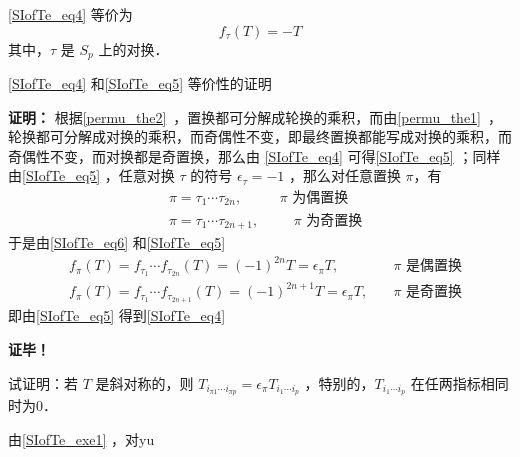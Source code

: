 \autoref{SIofTe_eq4} 等价为
\begin{equation}\label{SIofTe_eq5}
f_\tau(T)=-T
\end{equation}
其中，$\tau$ 是 $S_p$ 上的对换．
\begin{example}{}
\autoref{SIofTe_eq4} 和\autoref{SIofTe_eq5} 等价性的证明

\textbf{证明：}
根据\autoref{permu_the2}~，置换都可分解成轮换的乘积，而由\autoref{permu_the1}~，轮换都可分解成对换的乘积，而奇偶性不变，即最终置换都能写成对换的乘积，而奇偶性不变，而对换都是奇置换，那么由 \autoref{SIofTe_eq4} 可得\autoref{SIofTe_eq5} ；同样由\autoref{SIofTe_eq5} ，任意对换 $\tau$ 的符号 $\epsilon_\tau=-1$ ，那么对任意置换 $\pi$，有
\begin{equation}
\begin{aligned}
&\pi=\tau_1\cdots\tau_{2n}, \quad &\text{ $\pi$ 为偶置换}\\
&\pi=\tau_1\cdots\tau_{2n+1}, &\quad \text{ $\pi$ 为奇置换}
\end{aligned}
\end{equation}
于是由\autoref{SIofTe_eq6} 和\autoref{SIofTe_eq5} 
\begin{equation}
\begin{aligned}
&f_\pi(T)=f_{\tau_1}\cdots f_{\tau_{2n}}(T)=(-1)^{2n}T=\epsilon_\pi T,\quad&\text{$\pi$ 是偶置换}\\
&f_\pi(T)=f_{\tau_1}\cdots f_{\tau_{2n+1}}(T)=(-1)^{2n+1}T=\epsilon_\pi T,\quad&\text{$\pi$ 是奇置换}
\end{aligned}
\end{equation}
即由\autoref{SIofTe_eq5} 得到\autoref{SIofTe_eq4} 

\textbf{证毕！}

\end{example}






\begin{exercise}{}\label{SIofTe_exe1}
试证明：若 $T$ 是斜对称的，则 $T_{i_{\pi1}\cdots i_{\pi p}}=\epsilon_\pi T_{i_1\cdots i_p}$ ，特别的，$ T_{i_1\cdots i_p}$ 在任两指标相同时为0．
\end{exercise}

由\autoref{SIofTe_exe1} ，对yu